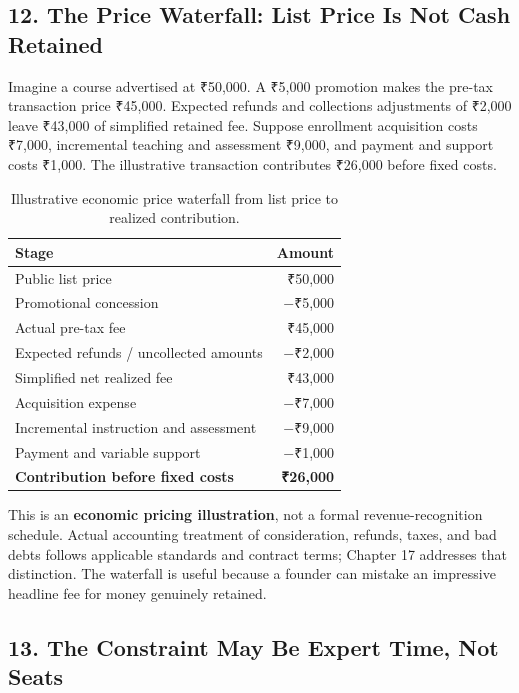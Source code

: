 \subsection*{12. The Price Waterfall: List Price Is Not Cash Retained}

Imagine a course advertised at ₹50,000. A ₹5,000 promotion makes the pre-tax transaction price ₹45,000. Expected refunds and collections adjustments of ₹2,000 leave ₹43,000 of simplified retained fee. Suppose enrollment acquisition costs ₹7,000, incremental teaching and assessment ₹9,000, and payment and support costs ₹1,000. The illustrative transaction contributes ₹26,000 before fixed costs.

\begin{table}[htbp]
\centering
\small
\begin{tabularx}{\columnwidth}{Xr}
\toprule
\textbf{Stage} & \textbf{Amount} \\
\midrule
Public list price & ₹50,000 \\
Promotional concession & $-$₹5,000 \\
Actual pre-tax fee & ₹45,000 \\
Expected refunds / uncollected amounts & $-$₹2,000 \\
Simplified net realized fee & ₹43,000 \\
Acquisition expense & $-$₹7,000 \\
Incremental instruction and assessment & $-$₹9,000 \\
Payment and variable support & $-$₹1,000 \\
\midrule
\textbf{Contribution before fixed costs} & \textbf{₹26,000} \\
\bottomrule
\end{tabularx}
\caption{Illustrative economic price waterfall from list price to realized contribution.}
\label{tab:price-waterfall}
\end{table}

This is an \textbf{economic pricing illustration}, not a formal revenue-recognition schedule. Actual accounting treatment of consideration, refunds, taxes, and bad debts follows applicable standards and contract terms; Chapter 17 addresses that distinction. The waterfall is useful because a founder can mistake an impressive headline fee for money genuinely retained.

\subsection*{13. The Constraint May Be Expert Time, Not Seats}

